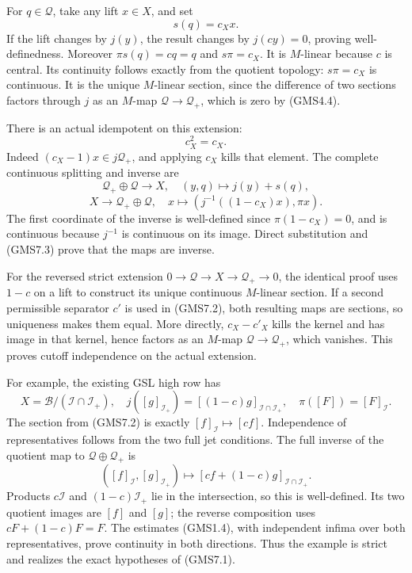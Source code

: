 For \(q\in\mathcal Q\), take any lift \(x\in X\), and set \[
s(q)=c_Xx.
\tag{GMS7.2}
\] If the lift changes by \(j(y)\), the result changes by \(j(cy)=0\),
proving well-definedness. Moreover \(\pi s(q)=cq=q\) and \(s\pi=c_X\).
It is \(M\)-linear because \(c\) is central. Its continuity follows
exactly from the quotient topology: \(s\pi=c_X\) is continuous. It is
the unique \(M\)-linear section, since the difference of two sections
factors through \(j\) as an \(M\)-map \(\mathcal Q\to\mathcal Q_+\),
which is zero by (GMS4.4).

There is an actual idempotent on this extension: \[
c_X^2=c_X.
\tag{GMS7.3}
\] Indeed \((c_X-1)x\in j\mathcal Q_+\), and applying \(c_X\) kills that
element. The complete continuous splitting and inverse are \[
\mathcal Q_+\oplus\mathcal Q\longrightarrow X,
\quad(y,q)\longmapsto j(y)+s(q),
\] \[
X\longrightarrow\mathcal Q_+\oplus\mathcal Q,
\quad x\longmapsto\left(j^{-1}((1-c_X)x),\pi x\right).
\tag{GMS7.4}
\] The first coordinate of the inverse is well-defined since
\(\pi(1-c_X)=0\), and is continuous because \(j^{-1}\) is continuous on
its image. Direct substitution and (GMS7.3) prove that the maps are
inverse.

For the reversed strict extension
\(0\to\mathcal Q\to X\to\mathcal Q_+\to0\), the identical proof uses
\(1-c\) on a lift to construct its unique continuous \(M\)-linear
section. If a second permissible separator \(c'\) is used in (GMS7.2),
both resulting maps are sections, so uniqueness makes them equal. More
directly, \(c_X-c'_X\) kills the kernel and has image in that kernel,
hence factors as an \(M\)-map \(\mathcal Q\to\mathcal Q_+\), which
vanishes. This proves cutoff independence on the actual extension.

For example, the existing GSL high row has \[
X=\mathcal B/(\mathcal I\cap\mathcal I_+),\quad
j([g]_{\mathcal I_+})=[(1-c)g]_{\mathcal I\cap\mathcal I_+},\quad
\pi([F])=[F]_{\mathcal I}.
\tag{GMS7.5}
\] The section from (GMS7.2) is exactly \([f]_{\mathcal I}\mapsto[cf]\).
Independence of representatives follows from the two full jet
conditions. The full inverse of the quotient map to
\(\mathcal Q\oplus\mathcal Q_+\) is \[
([f]_{\mathcal I},[g]_{\mathcal I_+})
\longmapsto[cf+(1-c)g]_{\mathcal I\cap\mathcal I_+}.
\tag{GMS7.6}
\] Products \(c\mathcal I\) and \((1-c)\mathcal I_+\) lie in the
intersection, so this is well-defined. Its two quotient images are
\([f]\) and \([g]\); the reverse composition uses \(cF+(1-c)F=F\). The
estimates (GMS1.4), with independent infima over both representatives,
prove continuity in both directions. Thus the example is strict and
realizes the exact hypotheses of (GMS7.1).

